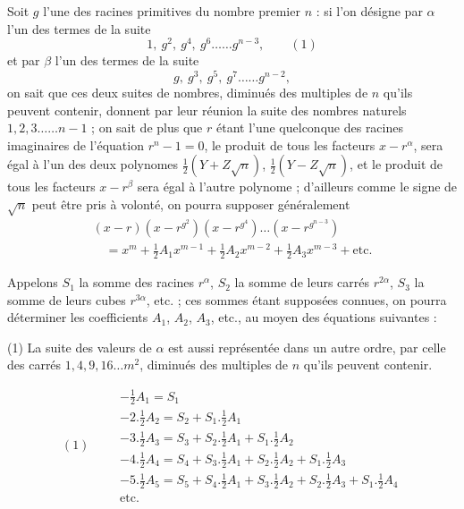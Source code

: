 \documentclass[11pt,a4paper]{article}
\begin{document}

Soit $g$ l'une des racines primitives du nombre premier $n$ : si l'on
désigne par $\alpha$ l'un des termes de la suite
\[
1,\ g^2,\ g^4,\ g^6 \ldots\ldots g^{n-3}, \qquad (1)
\]
et par $\beta$ l'un des termes de la suite
\[
g,\ g^3,\ g^5,\ g^7 \ldots\ldots g^{n-2},
\]
on sait que ces deux suites de nombres, diminués des multiples de $n$
qu'ils peuvent contenir, donnent par leur réunion la suite des nombres
naturels $1, 2, 3 \ldots\ldots n - 1$ ; on sait de plus que $r$ étant
l'une quelconque des racines imaginaires de l'équation $r^n - 1 = 0$, le
produit de tous les facteurs $x - r^\alpha$, sera égal à l'un des deux
polynomes $\frac{1}{2}(Y + Z\sqrt{n})$, $\frac{1}{2}(Y - Z\sqrt{n})$, et le
produit de tous les facteurs $x - r^\beta$ sera égal à l'autre polynome ;
d'ailleurs comme le signe de $\sqrt{n}$ peut être pris à volonté, on
pourra supposer généralement
\[
\begin{array}{l}
(x - r)(x - r^{g^2})(x - r^{g^4}) \ldots (x - r^{g^{n-3}}) \\
\quad = x^m + \frac{1}{2}A_1 x^{m-1} + \frac{1}{2}A_2 x^{m-2} + \frac{1}{2}A_3 x^{m-3} + \text{etc.}
\end{array}
\]

Appelons $S_1$ la somme des racines $r^\alpha$, $S_2$ la somme de leurs
carrés $r^{2\alpha}$, $S_3$ la somme de leurs cubes $r^{3\alpha}$, etc. ; ces
sommes étant supposées connues, on pourra déterminer les coefficients
$A_1$, $A_2$, $A_3$, etc., au moyen des équations suivantes :

(1) La suite des valeurs de $\alpha$ est aussi représentée dans un autre
ordre, par celle des carrés $1, 4, 9, 16 \ldots m^2$, diminués des multiples
de $n$ qu'ils peuvent contenir.


\[
(1) \qquad
\begin{array}{l}
-\frac{1}{2}A_1 = S_1 \\
-2.\frac{1}{2}A_2 = S_2 + S_1.\frac{1}{2}A_1 \\
-3.\frac{1}{2}A_3 = S_3 + S_2.\frac{1}{2}A_1 + S_1.\frac{1}{2}A_2 \\
-4.\frac{1}{2}A_4 = S_4 + S_3.\frac{1}{2}A_1 + S_2.\frac{1}{2}A_2 + S_1.\frac{1}{2}A_3 \\
-5.\frac{1}{2}A_5 = S_5 + S_4.\frac{1}{2}A_1 + S_3.\frac{1}{2}A_2 + S_2.\frac{1}{2}A_3 + S_1.\frac{1}{2}A_4 \\
\text{etc.}
\end{array}
\]
\end{document}
